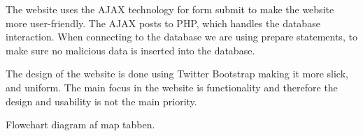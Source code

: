 The website uses the AJAX technology for form submit to make the website more user-friendly. The AJAX posts to PHP, which handles the database interaction. When connecting to the database we are using prepare statements, to make sure no malicious data is inserted into the database.

The design of the website is done using Twitter Bootstrap making it more slick, and uniform.
The main focus in the website is functionality and therefore the design and usability is not the main priority.




Flowchart diagram af map tabben.